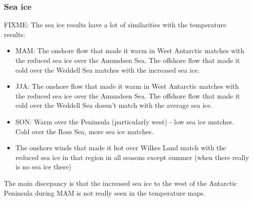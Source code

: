 \subsubsection{Sea ice}

FIXME: The sea ice results have a lot of similarities with the temperature results:
\begin{itemize}
\item MAM: The onshore flow that made it warm in West Antarctic matches with the reduced sea ice over the Amundsen Sea. The offshore flow that made it cold over the Weddell Sea matches with the increased sea ice.
\item JJA: The onshore flow that made it warm in West Antarctic matches with the reduced sea ice over the Amundsen Sea. The offshore flow that made it cold over the Weddell Sea doesn't match with the average sea ice.
\item SON: Warm over the Peninsula (particularly west) - low sea ice matches. Cold over the Ross Sea, more sea ice matches.
\item The onshore winds that made it hot over Wilkes Land match with the reduced sea ice in that region in all seasons except summer (when there really is no sea ice there)
\end{itemize}

The main discepancy is that the increased sea ice to the west of the Antarctic Peninsula during MAM is not really seen in the temperature maps.